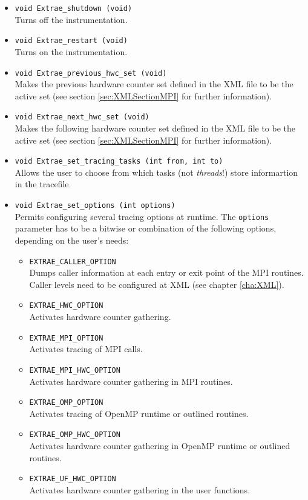 \begin{itemize}
 \item {\tt void Extrae\_shutdown (void)}\\
  Turns off the instrumentation.

 \item {\tt void Extrae\_restart (void)}\\
  Turns on the instrumentation.

 \item {\tt void Extrae\_previous\_hwc\_set (void)}\\
  Makes the previous hardware counter set defined in the XML file to be the active set (see section \ref{sec:XMLSectionMPI} for further information).

 \item {\tt void Extrae\_next\_hwc\_set (void)}\\
  Makes the following hardware counter set defined in the XML file to be the active set (see section \ref{sec:XMLSectionMPI} for further information).

 \item {\tt void Extrae\_set\_tracing\_tasks (int from, int to)}\\
  Allows the user to choose from which tasks (not {\em threads}!) store informartion in the tracefile

 \item {\tt void Extrae\_set\_options (int options)}\\
  Permits configuring several tracing options at runtime. The {\tt options} parameter has to be a bitwise or combination of the following options, depending on the user's needs:
  \begin{itemize}
   \item {\tt EXTRAE\_CALLER\_OPTION}\\
    Dumps caller information at each entry or exit point of the MPI routines. Caller levels need to be configured at XML (see chapter \ref{cha:XML}).
   \item {\tt EXTRAE\_HWC\_OPTION}\\
    Activates hardware counter gathering.
   \item {\tt EXTRAE\_MPI\_OPTION}\\
    Activates tracing of MPI calls.
   \item {\tt EXTRAE\_MPI\_HWC\_OPTION}\\
    Activates hardware counter gathering in MPI routines.
   \item {\tt EXTRAE\_OMP\_OPTION}\\
    Activates tracing of OpenMP runtime or outlined routines.
   \item {\tt EXTRAE\_OMP\_HWC\_OPTION}\\
    Activates hardware counter gathering in OpenMP runtime or outlined routines.
   \item {\tt EXTRAE\_UF\_HWC\_OPTION}\\
    Activates hardware counter gathering in the user functions.
  \end{itemize}


\end{itemize}
